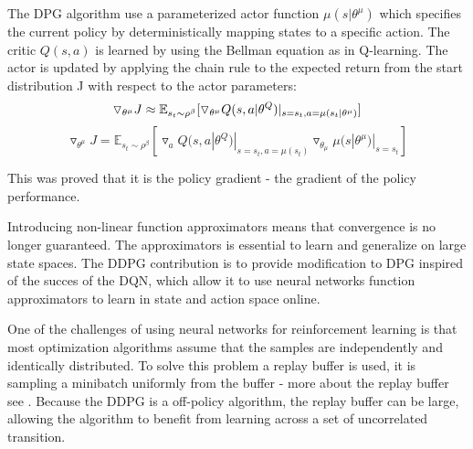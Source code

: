 The DPG algorithm use a parameterized actor function $\mu(s|\theta^\mu)$ which specifies the current policy by deterministically mapping states to a specific action. The critic $Q(s,a)$ is learned by using the Bellman equation as in Q-learning. The actor is updated by applying the chain rule to the expected return from the start distribution J with respect to the actor parameters:
\begin{equation}
\triangledown_{\theta^\mu} J \approx \mathbb{E}_{s_t \sim \rho^\beta} [\triangledown_{\theta^\mu}Q(s,a|\theta^Q)|_{s=s_t , a=\mu(s_t|\theta^\mu)}]  
\newline
\end{equation}
\begin{equation}
\triangledown_{\theta^\mu} J = \mathbb{E}_{s_t \sim \rho^\beta} [\triangledown_{a}Q(s,a|\theta^Q)|_{s=s_t , a=\mu(s_t)} \triangledown_{\theta_\mu}\mu(s|\theta^\mu)|_{s=s_t} ]
\end{equation} 

This was proved that it is the policy gradient - the gradient of the policy performance. 

Introducing non-linear function approximators means that convergence is no longer guaranteed. The approximators is essential to learn and generalize on large state spaces. The DDPG contribution is to provide modification to DPG inspired of the succes of the DQN, which allow it to use neural networks function approximators to learn in state and action space online. 

One of the challenges of using neural networks for reinforcement learning is that most optimization algorithms assume that the samples are independently  and identically distributed. To solve this problem a replay buffer is used, it is sampling a minibatch uniformly from the buffer - more about the replay buffer see . Because the DDPG is a off-policy algorithm, the replay buffer can be large, allowing the algorithm to benefit from learning across a set of uncorrelated transition.
              